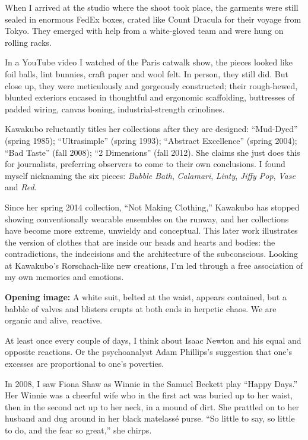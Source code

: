 When I arrived at the studio where the shoot took place, the garments
were still sealed in enormous FedEx boxes, crated like Count Dracula for
their voyage from Tokyo. They emerged with help from a white-gloved team
and were hung on rolling racks.

In a YouTube video I watched of the Paris catwalk show, the pieces
looked like foil balls, lint bunnies, craft paper and wool felt. In
person, they still did. But close up, they were meticulously and
gorgeously constructed; their rough-hewed, blunted exteriors encased in
thoughtful and ergonomic scaffolding, buttresses of padded wiring,
canvas boning, industrial-strength crinolines.

Kawakubo reluctantly titles her collections after they are designed:
``Mud-Dyed'' (spring 1985); ``Ultrasimple'' (spring 1993); ``Abstract
Excellence'' (spring 2004); ``Bad Taste'' (fall 2008); ``2 Dimensions''
(fall 2012). She claims she just does this for journalists, preferring
observers to come to their own conclusions. I found myself nicknaming
the six pieces: \emph{Bubble Bath}, \emph{Calamari}, \emph{Linty},
\emph{Jiffy Pop}, \emph{Vase} and \emph{Red}.

Since her spring 2014 collection, ``Not Making Clothing,'' Kawakubo has
stopped showing conventionally wearable ensembles on the runway, and her
collections have become more extreme, unwieldy and conceptual. This
later work illustrates the version of clothes that are inside our heads
and hearts and bodies: the contradictions, the indecisions and the
architecture of the subconscious. Looking at Kawakubo's Rorschach-like
new creations, I'm led through a free association of my own memories and
emotions.

\textbf{Opening image:} A white suit, belted at the waist, appears
contained, but a babble of valves and blisters erupts at both ends in
herpetic chaos. We are organic and alive, reactive.

At least once every couple of days, I think about Isaac Newton and his
equal and opposite reactions. Or the psychoanalyst Adam Phillips's
suggestion that one's excesses are proportional to one's poverties.

In 2008, I saw Fiona Shaw as Winnie in the Samuel Beckett play ``Happy
Days.'' Her Winnie was a cheerful wife who in the first act was buried
up to her waist, then in the second act up to her neck, in a mound of
dirt. She prattled on to her husband and dug around in her black
matelassé purse. ``So little to say, so little to do, and the fear so
great,'' she chirps.

